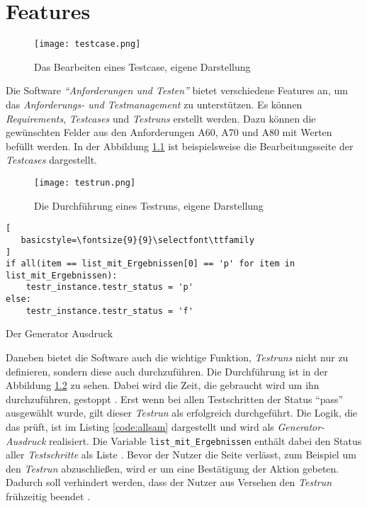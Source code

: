 \documentclass[11pt,a4paper]{report}
\begin{document}
\chapter{Features}


\begin{figure}[htpb]
  \centering
  \texttt{[image: testcase.png]}
  \caption{Das Bearbeiten eines Testcase, eigene Darstellung}
  \label{f:testcase}
\end{figure}




Die Software \textit{"`Anforderungen und Testen"'} bietet verschiedene Features an, um das \textit{Anforderungs- und Testmanagement} zu unterstützen. Es können \textit{Requirements}, \textit{Testcases} und \textit{Testruns} erstellt werden. Dazu können die gewünschten Felder aus den Anforderungen A60, A70 und A80 mit Werten befüllt werden. In der Abbildung \ref{f:testcase} ist beispielsweise die Bearbeitungsseite der \textit{Testcases} dargestellt.



\begin{figure}[htpb]
  \centering
  \texttt{[image: testrun.png]}
  \caption{Die Durchführung eines Testruns, eigene Darstellung}
  \label{f:testrun}
\end{figure}


\begin{listing}[htbp]
\begin{lstlisting}[
   basicstyle=\fontsize{9}{9}\selectfont\ttfamily
]
if all(item == list_mit_Ergebnissen[0] == 'p' for item in list_mit_Ergebnissen):
	testr_instance.testr_status = 'p'
else:
	testr_instance.testr_status = 'f'   
\end{lstlisting}
\caption{Der Generator Ausdruck}
\label{code:allsam}
\end{listing}



Daneben bietet die Software auch die wichtige Funktion, \textit{Testruns} nicht nur zu definieren, sondern diese auch durchzuführen. Die Durchführung ist in der Abbildung \ref{f:testrun} zu sehen. Dabei wird die Zeit, die gebraucht wird um ihn durchzuführen, gestoppt \cite{sotimer}. Erst wenn bei allen Testschritten der Status "`pass"' ausgewählt wurde, gilt dieser \textit{Testrun} als erfolgreich durchgeführt. Die Logik, die das prüft, ist im Listing \ref{code:allsam} dargestellt und wird als \textit{Generator-Ausdruck} realisiert. Die Variable \verb|list_mit_Ergebnissen| enthält dabei den Status aller \textit{Testschritte} als Liste \cite{soallsame}. Bevor der Nutzer die Seite verlässt, zum Beispiel um den \textit{Testrun} abzuschließen, wird er um eine Bestätigung der Aktion gebeten. Dadurch soll verhindert werden, dass der Nutzer aus Versehen den \textit{Testrun} frühzeitig beendet \cite{confirm}.
\end{document}
